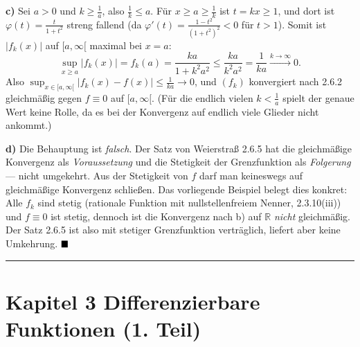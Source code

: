 \documentclass[a4paper,11pt]{article}
\providecommand{\qed}{\hfill\ensuremath{\blacksquare}}
\begin{document}
\textbf{c)} Sei $a>0$ und $k\ge \tfrac1a$, also $\tfrac1k\le a$. Für $x\ge a\ge\tfrac1k$ ist $t=kx\ge1$, und dort ist $\varphi(t)=\tfrac{t}{1+t^2}$ streng fallend (da $\varphi'(t)=\tfrac{1-t^2}{(1+t^2)^2}<0$ für $t>1$). Somit ist $|f_k(x)|$ auf $[a,\infty[$ maximal bei $x=a$:
\[\sup_{x\ge a}|f_k(x)|=f_k(a)=\frac{ka}{1+k^2a^2}\le\frac{ka}{k^2a^2}=\frac{1}{ka}\xrightarrow{k\to\infty}0.\]
Also $\sup_{x\in[a,\infty[}|f_k(x)-f(x)|\le\tfrac1{ka}\to0$, und $(f_k)$ konvergiert nach 2.6.2 gleichmäßig gegen $f\equiv0$ auf $[a,\infty[$. (Für die endlich vielen $k<\tfrac1a$ spielt der genaue Wert keine Rolle, da es bei der Konvergenz auf endlich viele Glieder nicht ankommt.)

\textbf{d)} Die Behauptung ist \emph{falsch}. Der Satz von Weierstraß 2.6.5 hat die gleichmäßige Konvergenz als \emph{Voraussetzung} und die Stetigkeit der Grenzfunktion als \emph{Folgerung} — nicht umgekehrt. Aus der Stetigkeit von $f$ darf man keineswegs auf gleichmäßige Konvergenz schließen. Das vorliegende Beispiel belegt dies konkret: Alle $f_k$ sind stetig (rationale Funktion mit nullstellenfreiem Nenner, 2.3.10(iii)) und $f\equiv0$ ist stetig, dennoch ist die Konvergenz nach b) auf $\mathbb{R}$ \emph{nicht} gleichmäßig. Der Satz 2.6.5 ist also mit stetiger Grenzfunktion verträglich, liefert aber keine Umkehrung. $\qed$\par\bigskip\hrule\bigskip
\section*{Kapitel 3 \quad Differenzierbare Funktionen (1. Teil)}
\end{document}
